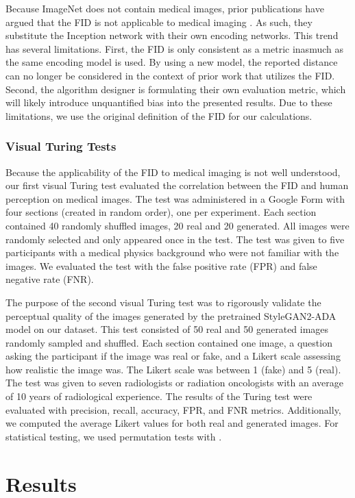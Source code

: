 \documentclass[runningheads]{llncs}
\begin{document}
Because ImageNet does not contain medical images, prior publications have argued that the FID is not applicable to medical imaging \cite{Chen2021,jung2021eijin,Tronchin2021}.
As such, they substitute the Inception network with their own encoding networks.
This trend has several limitations.
First, the FID is only consistent as a metric inasmuch as the same encoding model is used.
By using a new model, the reported distance can no longer be considered in the context of prior work that utilizes the FID.
Second, the algorithm designer is formulating their own evaluation metric, which will likely introduce unquantified bias into the presented results.
Due to these limitations, we use the original definition of the FID for our calculations.

\subsubsection{Visual Turing Tests}

Because the applicability of the FID to medical imaging is not well understood, our first visual Turing test evaluated the correlation between the FID and human perception on medical images.
The test was administered in a Google Form with four sections (created in random order), one per experiment.
Each section contained 40 randomly shuffled images, 20 real and 20 generated.
All images were randomly selected and only appeared once in the test.
The test was given to five participants with a medical physics background who were not familiar with the images.
We evaluated the test with the false positive rate (FPR) and false negative rate (FNR).

The purpose of the second visual Turing test was to rigorously validate the perceptual quality of the images generated by the pretrained StyleGAN2-ADA model on our dataset.
This test consisted of 50 real and 50 generated images randomly sampled and shuffled.
Each section contained one image, a question asking the participant if the image was real or fake, and a Likert scale assessing how realistic the image was.
The Likert scale was between 1 (fake) and 5 (real).
The test was given to seven radiologists or radiation oncologists with an average of 10 years of radiological experience.
The results of the Turing test were evaluated with precision, recall, accuracy, FPR, and FNR metrics.
Additionally, we computed the average Likert values for both real and generated images.
For statistical testing, we used permutation tests with .

\section{Results}
\end{document}
